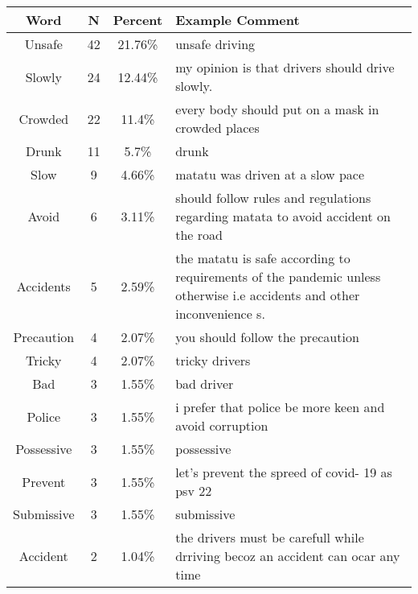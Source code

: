 \begin{tabular}{c|c|c|p{10cm}} \hline 
Word & N & Percent & Example Comment \\ 
\hline 
Unsafe & 42 & 21.76\% & unsafe driving \\ 
 Slowly & 24 & 12.44\% & my opinion is that drivers should drive slowly. \\ 
 Crowded & 22 & 11.4\% & every body should put on a mask in crowded places \\ 
 Drunk & 11 & 5.7\% & drunk \\ 
 Slow & 9 & 4.66\% & matatu was driven at a slow pace \\ 
 Avoid & 6 & 3.11\% & should follow rules and regulations regarding matata to avoid accident on the road \\ 
 Accidents & 5 & 2.59\% & the matatu is safe according to requirements of the pandemic unless otherwise i.e accidents and other inconvenience s. \\ 
 Precaution & 4 & 2.07\% & you should follow the precaution \\ 
 Tricky & 4 & 2.07\% & tricky drivers \\ 
 Bad & 3 & 1.55\% & bad driver \\ 
 Police & 3 & 1.55\% & i prefer that police be more keen and avoid corruption \\ 
 Possessive & 3 & 1.55\% & possessive \\ 
 Prevent & 3 & 1.55\% & let's prevent the spreed of covid- 19 as psv 22 \\ 
 Submissive & 3 & 1.55\% & submissive \\ 
 Accident & 2 & 1.04\% & the drivers must be carefull while drriving becoz an accident can ocar any time \\ 
\hline 
\end{tabular}
